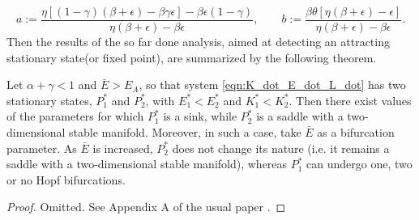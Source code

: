 \begin{equation}
	a:=\frac{\eta[(1-\gamma)(\beta+\epsilon)-\beta\gamma\epsilon]-\beta\epsilon(1-\gamma)}{\eta(\beta+\epsilon)-\beta\epsilon}, \qquad b:=\frac{\beta\theta[\eta(\beta+\epsilon)-\epsilon]}{\eta(\beta+\epsilon)-\beta\epsilon}.
\end{equation}
Then the results of the so far done analysis, aimed at detecting an attracting stationary state(or fixed point), are summarized by the following theorem.
\begin{thm} \label{thm:result_of_analysis}
	Let $\alpha+\gamma<1$ and $\bar{E}>E_A$, so that system \eqref{eqn:K_dot_E_dot_L_dot} has two stationary states, $P_1^*$ and $P_2^*$, with $E_1^*<E_2^*$ and $K_1^*<K_2^*$. Then there exist values of the parameters for which $P_1^*$ is a sink, while $P_2^*$ is a saddle with a two-dimensional stable manifold. Moreover, in such a case, take $\bar{E}$ as a bifurcation parameter. As $\bar{E}$ is increased, $P_2^*$ does not change its nature (i.e. it remains a saddle with a two-dimensional stable manifold), whereas $P_1^*$ can undergo one, two or no Hopf bifurcations.
\end{thm}
\begin{proof}
	Omitted. See Appendix A of the usual paper \cite{antoci_poverty_2011}.
\end{proof}



